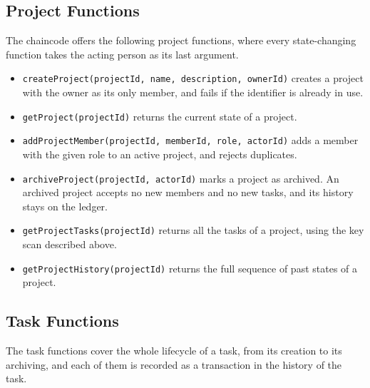 \subsection{Project Functions}

The chaincode offers the following project functions, where every state-changing function takes the acting person as its last argument.

\begin{itemize}
    \item \texttt{createProject(projectId, name, description, ownerId)} creates a project with the owner as its only member, and fails if the identifier is already in use.
    \item \texttt{getProject(projectId)} returns the current state of a project.
    \item \texttt{addProjectMember(projectId, memberId, role, actorId)} adds a member with the given role to an active project, and rejects duplicates.
    \item \texttt{archiveProject(projectId, actorId)} marks a project as archived. An archived project accepts no new members and no new tasks, and its history stays on the ledger.
    \item \texttt{getProjectTasks(projectId)} returns all the tasks of a project, using the key scan described above.
    \item \texttt{getProjectHistory(projectId)} returns the full sequence of past states of a project.
\end{itemize}

\subsection{Task Functions}

The task functions cover the whole lifecycle of a task, from its creation to its archiving, and each of them is recorded as a transaction in the history of the task.

